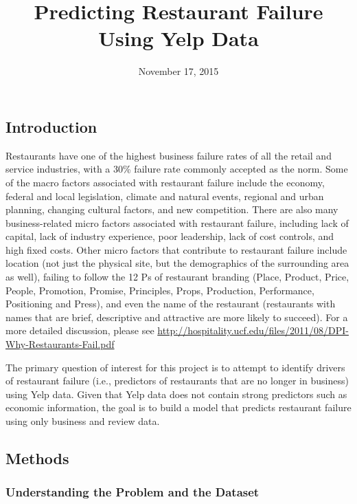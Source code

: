 \documentclass[]{article}
\title{Predicting Restaurant Failure Using Yelp Data}
\author{}
\date{November 17, 2015}
\begin{document}
\maketitle


\subsection{Introduction}\label{introduction}

Restaurants have one of the highest business failure rates of all the
retail and service industries, with a 30\% failure rate commonly
accepted as the norm. Some of the macro factors associated with
restaurant failure include the economy, federal and local legislation,
climate and natural events, regional and urban planning, changing
cultural factors, and new competition. There are also many
business-related micro factors associated with restaurant failure,
including lack of capital, lack of industry experience, poor leadership,
lack of cost controls, and high fixed costs. Other micro factors that
contribute to restaurant failure include location (not just the physical
site, but the demographics of the surrounding area as well), failing to
follow the 12 Ps of restaurant branding (Place, Product, Price, People,
Promotion, Promise, Principles, Props, Production, Performance,
Positioning and Press), and even the name of the restaurant (restaurants
with names that are brief, descriptive and attractive are more likely to
succeed). For a more detailed discussion, please see
\url{http://hospitality.ucf.edu/files/2011/08/DPI-Why-Restaurants-Fail.pdf}

The primary question of interest for this project is to attempt to
identify drivers of restaurant failure (i.e., predictors of restaurants
that are no longer in business) using Yelp data. Given that Yelp data
does not contain strong predictors such as economic information, the
goal is to build a model that predicts restaurant failure using only
business and review data.

\subsection{Methods}\label{methods}

\subsubsection{Understanding the Problem and the
Dataset}\label{understanding-the-problem-and-the-dataset}
\end{document}
